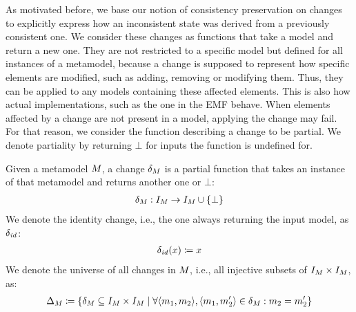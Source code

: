 As motivated before, we base our notion of consistency preservation on changes to explicitly express how an inconsistent state was derived from a previously consistent one.
We consider these changes as functions that take a model and return a new one.
They are not restricted to a specific model but defined for all instances of a metamodel, because a change is supposed to represent how specific elements are modified, such as adding, removing or modifying them.
Thus, they can be applied to any models containing these affected elements.
This is also how actual implementations, such as the one in the \gls{EMF} behave.
When elements affected by a change are not present in a model, applying the change may fail.
For that reason, we consider the function describing a change to be partial.
We denote partiality by returning $\bot$ for inputs the function is undefined for.
\begin{definition}[Change]
    \label{def:change}
    Given a metamodel $\metamodel{M}{}$, a change $\change{\metamodel{M}{}}$ is a partial function that takes an instance of that metamodel and returns another one or $\bot$:
    \begin{align*}
        \change{\metamodel{M}{}}: \metamodelinstanceset{M}{} \rightarrow \metamodelinstanceset{M}{} \cup \setted{\bot}
    \end{align*}
    We denote the identity change, i.e., the one always returning the input model, as $\delta_{\mathit{id}}$:
    \begin{align*}
        \delta_{\mathit{id}}(x) \coloneqq x
    \end{align*}
    We denote the universe of all changes in $\metamodel{M}{}$, i.e., all injective subsets of $\metamodelinstanceset{M}{} \times \metamodelinstanceset{M}{}$, as:
    \begin{align*}
        \changeuniverse{\metamodel{M}{}} \equalsperdefinition \setted{\change{\metamodel{M}{}} \subseteq \metamodelinstanceset{M}{} \times \metamodelinstanceset{M}{} \mid
        \forall \tupled{\model{m}{1}, \model{m}{2}}, \tupled{\model{m}{1}, \model{m}{2}'} \in \change{\metamodel{M}{}} : \model{m}{2} = \model{m}{2}'}
    \end{align*}
\end{definition}
